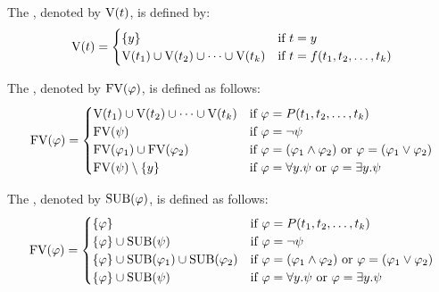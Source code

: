 \begin{definition}\label{def.2.17}
	The , denoted by $\text{V}(t)$, is defined by:
	\[\V(t)=
		\begin{cases}
			\{y\}                                    & \text{if $t=y$}                    \\ %
			\V(t_1)\cup \V(t_2)\cup\dots\cup \V(t_k) & \text{if $t=f(t_1,t_2,\dots,t_k)$} 
		\end{cases}\]
	
	The , denoted by $\text{FV}(\varphi)$, is defined as follows:
	\[\FV(\varphi)=
		\begin{cases} %
			\V(t_1)\cup \V(t_2)\cup\dots\cup \V(t_k) & \text{if $\varphi=P(t_1,t_2,\dots,t_k)$}                               \\
			\FV(\psi)                                 & \text{if $\varphi=\neg\psi$}                               \\
			\FV(\varphi_1)\cup\FV(\varphi_2)         & \text{if $\varphi=(\varphi_1\wedge\varphi_2)$ or $\varphi=(\varphi_1\vee\varphi_2)$} \\
			\FV(\psi)\setminus\{y\}                  & \text{if $\varphi=\forall y.\psi$ or $\varphi=\exists y.\psi$}                 
		\end{cases}\]
\end{definition}

\begin{definition}\label{def.2.18}
	The , denoted by $\text{SUB}(\varphi)$, is defined as follows:
	\[\text{FV}(\varphi)=
		\begin{cases}
			\{\varphi\} & \text{if $\varphi=P(t_1,t_2,\dots,t_k)$}                               \\
			\{\varphi\}\cup\text{SUB}(\psi)                                 & \text{if $\varphi=\neg\psi$}                               \\
			\{\varphi\}\cup\text{SUB}(\varphi_1)\cup\text{SUB}(\varphi_2)         & \text{if $\varphi=(\varphi_1\wedge\varphi_2)$ or $\varphi=(\varphi_1\vee\varphi_2)$} \\
			\{\varphi\}\cup\text{SUB}(\psi)                  & \text{if $\varphi=\forall y.\psi$ or $\varphi=\exists y.\psi$}                 
		\end{cases}\]
\end{definition}

